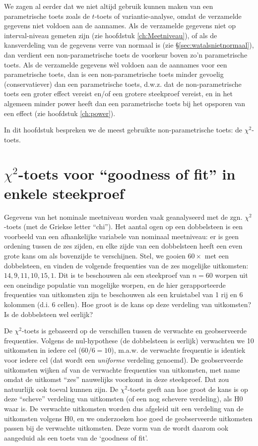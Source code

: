 \documentclass[
]{book}
\begin{document}
We zagen al eerder dat we niet altijd gebruik kunnen maken van een
parametrische toets zoals de \(t\)-toets of variantie-analyse, omdat de verzamelde
gegevens niet voldoen aan de aannames. Als de verzamelde gegevens niet
op interval-niveau gemeten zijn (zie hoofdstuk
\ref{ch:Meetniveau}), of als de kansverdeling van de gegevens
verre van normaal is (zie
§\ref{sec:watalsnietnormaal}), dan verdient een non-parametrische
toets de voorkeur boven zo'n parametrische toets. Als de verzamelde
gegevens wèl voldoen aan de aannames voor een parametrische toets, dan
is een non-parametrische toets minder gevoelig (conservatiever) dan een
parametrische toets, d.w.z. dat de non-parametrische toets een groter
effect vereist en/of een grotere steekproef vereist, en in het algemeen
minder power heeft dan een parametrische toets bij het opsporen van een
effect (zie hoofdstuk \ref{ch:power}).

In dit hoofdstuk bespreken we de meest gebruikte non-parametrische
toets: de \(\chi^2\)-toets.

\hypertarget{sec:chi2gof}{%
\section{\texorpdfstring{\(\chi^2\)-toets voor ``goodness of fit'' in enkele steekproef}{\textbackslash chi\^{}2-toets voor ``goodness of fit'' in enkele steekproef}}\label{sec:chi2gof}}

Gegevens van het nominale meetniveau worden vaak geanalyseerd met de
zgn. \(\chi^2\)-toets (met de Griekse letter ``chi''). Het aantal ogen op een dobbelsteen
is een voorbeeld van een afhankelijke variabele van nominaal meetniveau:
er is geen ordening tussen de zes zijden, en elke zijde van een
dobbelsteen heeft een even grote kans om als bovenzijde te verschijnen.
Stel, we gooien \(60\times\) met een dobbelsteen, en vinden de volgende
frequenties van de zes mogelijke uitkomsten: \(14, 9, 11, 10, 15, 1\). Dit
is te beschouwen als een steekproef van \(n=60\) worpen uit een oneindige
populatie van mogelijke worpen, en de hier gerapporteerde frequenties
van uitkomsten zijn te beschouwen als een kruistabel van 1 rij en 6
kolommen (d.i. 6 cellen). Hoe groot is de kans op deze verdeling van
uitkomsten? Is de dobbelsteen wel eerlijk?

De \(\chi^2\)-toets is gebaseerd op de verschillen tussen de verwachte en geobserveerde
frequenties. Volgens de nul-hypothese (de dobbelsteen is eerlijk)
verwachten we 10 uitkomsten in iedere cel (\(60/6=10\)), m.a.w. de
verwachte frequentie is identiek voor iedere cel (dat wordt een \emph{uniforme} verdeling genoemd).
De geobserveerde
uitkomsten wijken af van de verwachte frequenties van uitkomsten, met
name omdat de uitkomst ``zes'' nauwelijks voorkomt in deze steekproef. Dat
zou natuurlijk ook toeval kunnen zijn. De \(\chi^2\)-toets geeft aan hoe groot de kans is
op deze ``scheve'' verdeling van uitkomsten (of een nog schevere verdeling), als H0 waar is.
De verwachte
uitkomsten worden dus afgeleid uit een verdeling van de uitkomsten
volgens H0, en we onderzoeken hoe goed de geobserveerde uitkomsten
passen bij de verwachte uitkomsten. Deze vorm van de wordt daarom ook
aangeduid als een toets van de `goodness of fit'.
\end{document}
